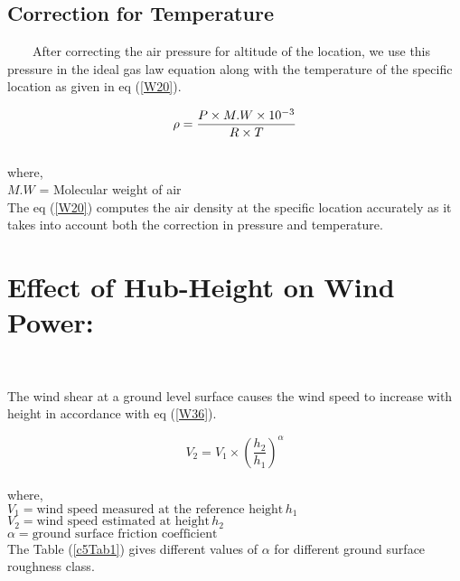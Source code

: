 \subsection{Correction for Temperature}
\
\
\
\
After correcting the air pressure for altitude of the location, we use this pressure in the ideal gas law equation along with the temperature of the specific location as given in eq (\ref{W20}).

\begin{equation}
\label{W20}
\rho = \frac{P \times M.W \times 10^{-3}}{R \times T}\\
\end{equation}\\
where,\\
$ M.W $ = Molecular weight of air $  $\\

The eq (\ref{W20}) computes the air density at the specific location accurately as it takes into account both the correction in pressure and temperature.


\section{Effect of Hub-Height on Wind Power:}
\
\
\
\

The wind shear at a ground level surface causes the wind speed to increase with height in accordance with eq (\ref{W36}).

\begin{equation}
\label{W36}
V_2 = V_1 \times \left(\frac{h_2}{h_1}\right)^\alpha
\end{equation}\\
where,\\
$V_1 = \text{wind speed measured at the reference height} \,h_1$\\
$V_2 = \text{wind speed estimated at height} \,h_2$\\
$\alpha = \text{ground surface friction coefficient}$\\

The Table (\ref{c5Tab1}) gives different values of $\alpha$ for different ground surface roughness class.

